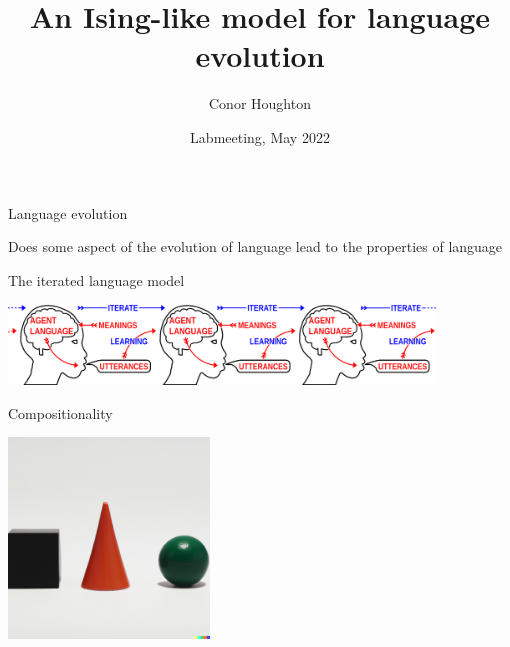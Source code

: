 \documentclass{beamer}
\title[An Ising-like model for language evolution]{An Ising-like model for language evolution}
\author{Conor Houghton}
\date{Labmeeting, May 2022}
\begin{document}
\maketitle




\begin{frame}{Language evolution}
    \begin{minipage}[t][.7\textheight]{\textwidth}
    \vskip 1cm
Does some aspect of the evolution of language lead to the properties of language
\end{minipage}
\end{frame}



\begin{frame}{The iterated language model}
    \begin{minipage}[t][.7\textheight]{\textwidth}
    \vskip 1cm
    \begin{center}
      \includegraphics[width=0.85\textwidth]{ilm.png}
    \end{center}
\end{minipage}
\end{frame}



\begin{frame}{Compositionality}
  \begin{minipage}[t][.7\textheight]{\textwidth}
    \vskip 1cm
    \begin{center}
      \includegraphics[width=0.4\textwidth]{compositional.png}
    \end{center}
\end{minipage}
\vfill
\color{gray}
\color{black}
\end{frame}
\end{document}
